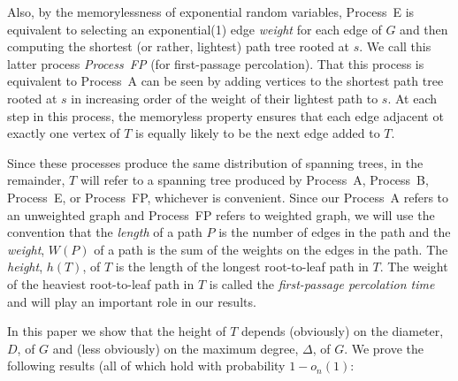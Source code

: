 \documentclass[lotsofwhite]{patmorin}
\begin{document}
Also, by the memorylessness of exponential random variables, Process~E
is equivalent to selecting an exponential(1) edge \emph{weight} for
each edge of $G$ and then computing the shortest (or rather, lightest)
path tree rooted at $s$.  We call this latter process \emph{Process~FP}
(for first-passage percolation).  That this process is equivalent to
Process~A can be seen by adding vertices to the shortest path tree rooted
at $s$ in increasing order of the weight of their lightest path to $s$.
At each step in this process, the memoryless property ensures that each
edge adjacent ot exactly one vertex of $T$ is equally likely to be the
next edge added to $T$.

Since these processes produce the same distribution of spanning trees,
in the remainder, $T$ will refer to a spanning tree produced by Process~A,
Process~B, Process~E, or Process~FP, whichever is convenient.  Since our
Process~A refers to an unweighted graph and Process~FP refers to weighted
graph, we will use the convention that the \emph{length} of a path $P$ is
the number of edges in the path and the \emph{weight}, $W(P)$ of a path
is the sum of the weights on the edges in the path. The \emph{height},
$h(T)$, of $T$ is the length of the longest root-to-leaf path in $T$.
The weight of the heaviest root-to-leaf path in $T$ is called the
\emph{first-passage percolation time} and will play an important role
in our results.

In this paper we show that the height of $T$ depends (obviously) on
the diameter, $D$, of $G$ and (less obviously) on the maximum degree,
$\Delta$, of $G$.  We prove the following results (all of which hold
with probability $1-o_n(1)$:
\end{document}
